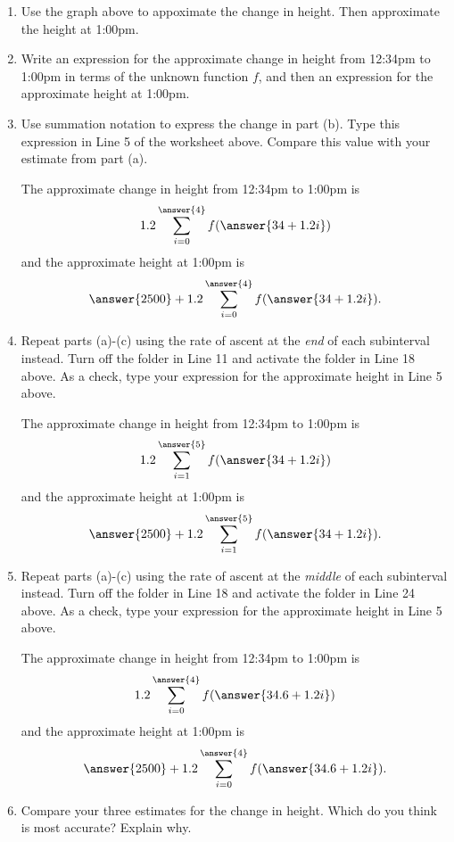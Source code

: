 \documentclass{ximera}
\begin{document}
\begin{example}
\begin{enumerate}
\item Use the graph above to appoximate the change in height. Then approximate the height at 1:00pm.

\item Write an expression for the approximate change in height from 12:34pm to 1:00pm in terms of the unknown function $f$, and then an expression for the approximate height at 1:00pm.

\item Use summation notation to express the change in part (b). Type this expression in Line 5 of the worksheet above. Compare this value with your estimate from part (a).

The approximate change in height from 12:34pm to 1:00pm is
\[
  1.2 \sum_{i=0}^{\answer{4}} f(\answer{34 + 1.2i})  
\]
and the approximate height at 1:00pm is
\[
     \answer{2500} + 1.2 \sum_{i=0}^{\answer{4}} f(\answer{34 + 1.2i})  .
\]

\item Repeat parts (a)-(c) using the rate of ascent at the \emph{end} of each subinterval instead. Turn off the folder in Line 11 and activate the folder in Line 18 above. As a check, type your expression for the approximate height in Line 5 above.

The approximate change in height from 12:34pm to 1:00pm is
\[
  1.2 \sum_{i=1}^{\answer{5}} f(\answer{34 + 1.2i})  
\]
and the approximate height at 1:00pm is
\[
     \answer{2500} + 1.2 \sum_{i=1}^{\answer{5}} f(\answer{34 + 1.2i})  .
\]

\item Repeat parts (a)-(c) using the rate of ascent at the \emph{middle} of each subinterval instead. Turn off the folder in Line 18 and activate the folder in Line 24 above. As a check, type your expression for the approximate height in Line 5 above.

The approximate change in height from 12:34pm to 1:00pm is
\[
  1.2 \sum_{i=0}^{\answer{4}} f(\answer{34.6+ 1.2i})  
\]
and the approximate height at 1:00pm is
\[
     \answer{2500} + 1.2 \sum_{i=0}^{\answer{4}} f(\answer{34.6 + 1.2i})  .
\]

\item Compare your three estimates for the change in height. Which do you think is most accurate? Explain why.

\end{enumerate}
\end{example} 
\end{document}
